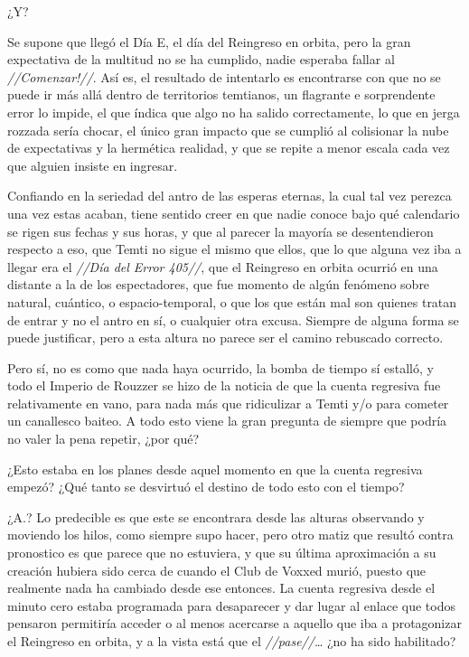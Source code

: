 \documentclass[
  spanish,
]{book}
\begin{document}
¿Y?

Se supone que llegó el Día E, el día del Reingreso en orbita, pero la gran expectativa de la multitud no se ha cumplido, nadie esperaba fallar al \emph{//Comenzar!//}. Así es, el resultado de intentarlo es encontrarse con que no se puede ir más allá dentro de territorios temtianos, un flagrante e sorprendente error lo impide, el que índica que algo no ha salido correctamente, lo que en jerga rozzada sería chocar, el único gran impacto que se cumplió al colisionar la nube de expectativas y la hermética realidad, y que se repite a menor escala cada vez que alguien insiste en ingresar.

Confiando en la seriedad del antro de las esperas eternas, la cual tal vez perezca una vez estas acaban, tiene sentido creer en que nadie conoce bajo qué calendario se rigen sus fechas y sus horas, y que al parecer la mayoría se desentendieron respecto a eso, que Temti no sigue el mismo que ellos, que lo que alguna vez iba a llegar era el \emph{//Día del Error 405//}, que el Reingreso en orbita ocurrió en una distante a la de los espectadores, que fue momento de algún fenómeno sobre natural, cuántico, o espacio-temporal, o que los que están mal son quienes tratan de entrar y no el antro en sí, o cualquier otra excusa. Siempre de alguna forma se puede justificar, pero a esta altura no parece ser el camino rebuscado correcto.

Pero sí, no es como que nada haya ocurrido, la bomba de tiempo sí estalló, y todo el Imperio de Rouzzer se hizo de la noticia de que la cuenta regresiva fue relativamente en vano, para nada más que ridiculizar a Temti y/o para cometer un canallesco baiteo. A todo esto viene la gran pregunta de siempre que podría no valer la pena repetir, ¿por qué?

¿Esto estaba en los planes desde aquel momento en que la cuenta regresiva empezó? ¿Qué tanto se desvirtuó el destino de todo esto con el tiempo?

¿A.? Lo predecible es que este se encontrara desde las alturas observando y moviendo los hilos, como siempre supo hacer, pero otro matiz que resultó contra pronostico es que parece que no estuviera, y que su última aproximación a su creación hubiera sido cerca de cuando el Club de Voxxed murió, puesto que realmente nada ha cambiado desde ese entonces. La cuenta regresiva desde el minuto cero estaba programada para desaparecer y dar lugar al enlace que todos pensaron permitiría acceder o al menos acercarse a aquello que iba a protagonizar el Reingreso en orbita, y a la vista está que el \emph{//pase//}\ldots{} ¿no ha sido habilitado?
\end{document}
